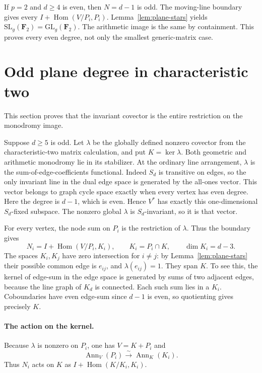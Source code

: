 \documentclass[11pt]{article}
\begin{document}
If $p=2$ and $d\ge4$ is even, then $N=d-1$ is odd. The moving-line boundary gives every $I+\operatorname{Hom}(V/P_i,P_i)$. Lemma~\ref{lem:plane-stars} yields
$\mathrm{SL}_g(\mathbf F_2)=\mathrm{GL}_g(\mathbf F_2)$. The arithmetic image is the same by containment. This proves every even degree, not only the smallest generic-matrix case.

\section{Odd plane degree in characteristic two}\label{sec:plane-odd-two}
This section proves that the invariant covector is the entire restriction on the monodromy image.

Suppose $d\ge5$ is odd. Let $\lambda$ be the globally defined nonzero covector from the characteristic-two matrix calculation, and put $K=\ker\lambda$. Both geometric and arithmetic monodromy lie in its stabilizer. At the ordinary line arrangement, $\lambda$ is the sum-of-edge-coefficients functional. Indeed $S_d$ is transitive on edges, so the only invariant line in the dual edge space is generated by the all-ones vector. This vector belongs to graph cycle space exactly when every vertex has even degree. Here the degree is $d-1$, which is even. Hence $V^*$ has exactly this one-dimensional $S_d$-fixed subspace. The nonzero global $\lambda$ is $S_d$-invariant, so it is that vector.

For every vertex, the node sum on $P_i$ is the restriction of $\lambda$. Thus the boundary gives
\[
 N_i=I+\operatorname{Hom}(V/P_i,K_i),\qquad K_i=P_i\cap K,
                      \qquad \dim K_i=d-3.
\]
The spaces $K_i,K_j$ have zero intersection for $i\ne j$: by Lemma~\ref{lem:plane-stars} their possible common edge is $e_{ij}$, and $\lambda(e_{ij})=1$. They span $K$. To see this, the kernel of edge-sum in the edge space is generated by sums of two adjacent edges, because the line graph of $K_d$ is connected. Each such sum lies in a $K_i$. Coboundaries have even edge-sum since $d-1$ is even, so quotienting gives precisely $K$.

\paragraph{The action on the kernel.}
Because $\lambda$ is nonzero on $P_i$, one has $V=K+P_i$ and
\[
 \operatorname{Ann}_V(P_i)\xrightarrow{\sim}\operatorname{Ann}_K(K_i).
\]
Thus $N_i$ acts on $K$ as $I+\operatorname{Hom}(K/K_i,K_i)$.
\end{document}
